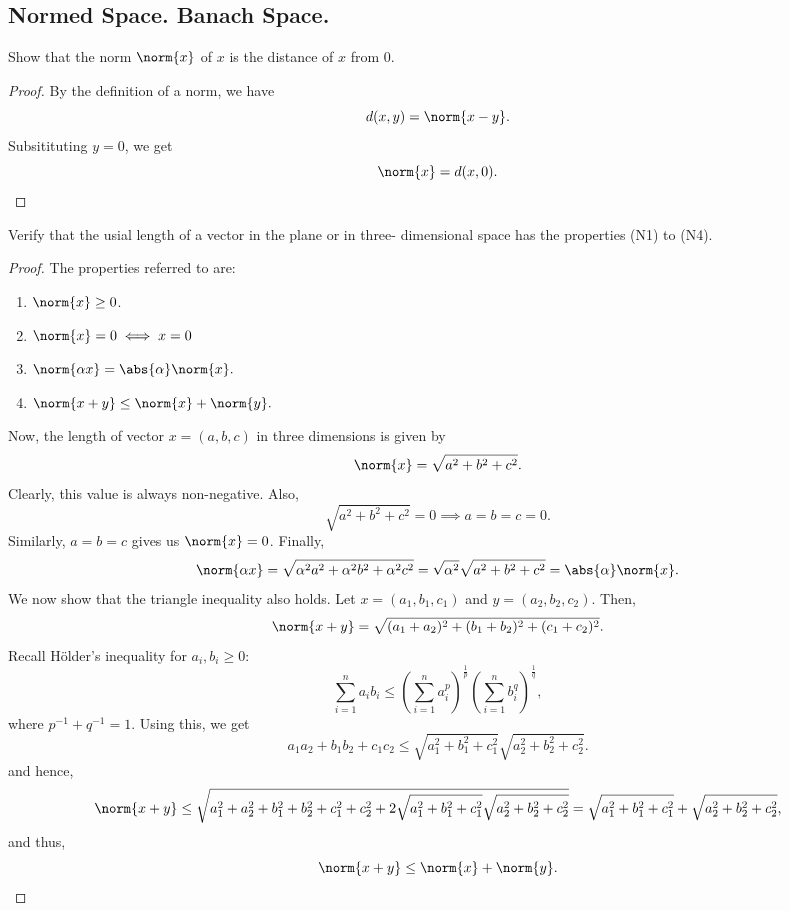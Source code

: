 \subsection{Normed Space. Banach Space.}

\begin{question}
    Show that the norm $\norm{x}$ of $x$ is the distance of $x$ from 0.
    \label{section2.2-1}
\end{question}
\begin{proof}
    By the definition of a norm, we have
    \[d(x,y) = \norm{x-y}.\]
    Subsitituting $y = 0$, we get
    \[\norm{x} = d(x,0).\]
\end{proof}

\begin{question}
    Verify that the usial length of a vector in the plane or in three- dimensional space has the properties (N1) to (N4).
    \label{section2.2-2}
\end{question}
\begin{proof}
    The properties referred to are:
    \begin{enumerate}
        \item $\norm{x} \geq 0$.
        \item $\norm{x} = 0 \iff x = 0$
        \item $\norm{\alpha x} = \abs{\alpha} \norm{x}.$
        \item $\norm{x + y} \leq \norm{x} + \norm{y}.$
    \end{enumerate}
    Now, the length of vector $x = (a,b,c)$ in three dimensions is given by 
    \[\norm{x} = \sqrt{a^2 + b^2 + c^2}.\]
    Clearly, this value is always non-negative. Also, 
    \[\sqrt{a^2 + b^2 + c^2} = 0 \implies a = b = c = 0.\]
    Similarly, $a = b = c$ gives us $\norm{x} = 0$. Finally, 
    \[\norm{\alpha x} = \sqrt{\alpha^2 a^2 + \alpha^2 b^2 + \alpha^2 c^2} = \sqrt{\alpha^2} \sqrt{a^2 + b^2 + c^2} = \abs{\alpha}\norm{x}.\]
    We now show that the triangle inequality also holds. Let $x = (a_1 , b_1 , c_1)$ and $y = (a_2 , b_2 , c_2)$. Then,
    \[\norm{x+y} = \sqrt{(a_1 + a_2)^2 + (b_1 + b_2)^2 + (c_1 + c_2)^2}.\]
    Recall Hölder's inequality for $a_i , b_i \geq 0$:
    \[\sum_{i=1}^n a_ib_i \leq \left(\sum_{i=1}^n a_i^p\right)^{\frac{1}{p}} \left(\sum_{i=1}^n b_i^q\right)^{\frac{1}{q}},\]
    where $p^{-1} + q^{-1} = 1$. Using this, we get
    \[a_1a_2 + b_1b_2 + c_1c_2 \leq \sqrt{a_1^2 + b_1^2 + c_1^2}\sqrt{a_2^2 + b_2^2 + c_2^2}.\]
     and hence,
     \[\norm{x+y} \leq \sqrt{a_1^2 + a_2^2 + b_1^2 + b_2^2 + c_1^2 + c_2^2 + 2 \sqrt{a_1^2 + b_1^2 + c_1^2}\sqrt{a_2^2 + b_2^2 + c_2^2}} = \sqrt{a_1^2 + b_1^2 + c_1^2} + \sqrt{a_2^2 + b_2^2 + c_2^2},\]
     and thus, 
     \[\norm{x+y} \leq \norm{x} + \norm{y}.\]
\end{proof}

